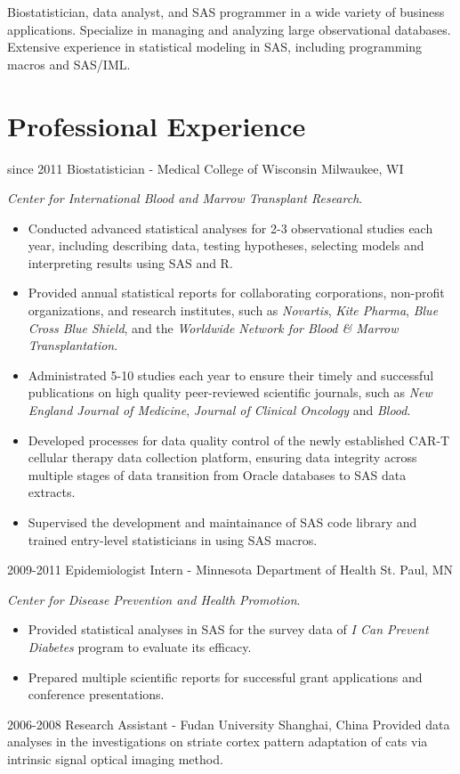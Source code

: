 Biostatistician, data analyst, and SAS programmer in a wide variety of business applications. Specialize in managing and analyzing large observational databases. Extensive experience in statistical modeling in SAS, including programming macros and SAS/IML.\\

\section{Professional Experience}

\begin{entrylist}
  \entry
    {since 2011}
    {Biostatistician - Medical College of Wisconsin}
    {Milwaukee, WI}
    {
    \textit{Center for International Blood and Marrow Transplant Research}.
    \begin{itemize}
      \item Conducted advanced statistical analyses for 2-3 observational studies each year, including describing data, testing hypotheses, selecting models and interpreting results using SAS and R.
      \item Provided annual statistical reports for collaborating corporations, non-profit organizations, and research institutes, such as \textit{Novartis}, \textit{Kite Pharma}, \textit{Blue Cross Blue Shield}, and the \textit{Worldwide Network for Blood \& Marrow Transplantation}.
      \item Administrated 5-10 studies each year to ensure their timely and successful publications on high quality peer-reviewed scientific journals, such as \textit{New England Journal of Medicine}, \textit{Journal of Clinical Oncology} and \textit{Blood}.
      \item Developed processes for data quality control of the newly established CAR-T cellular therapy data collection platform, ensuring data integrity across multiple stages of data transition from Oracle databases to SAS data extracts.
      \item Supervised the development and maintainance of SAS code library and trained entry-level statisticians in using SAS macros.
    \end{itemize}
    }
  \entry
    {2009-2011}
    {Epidemiologist Intern - Minnesota Department of Health}
    {St. Paul, MN}
    {
    \textit{Center for Disease Prevention and Health Promotion}.
    \begin{itemize}
      \item Provided statistical analyses in SAS for the survey data of \textit{I Can Prevent Diabetes} program to evaluate its efficacy.
      \item Prepared multiple scientific reports for successful grant applications and conference presentations.
    \end{itemize}
    }
  \entry
    {2006-2008}
    {Research Assistant - Fudan University}
    {Shanghai, China}
    {Provided data analyses in the investigations on striate cortex pattern adaptation of cats via intrinsic signal optical imaging method.}
\end{entrylist}

